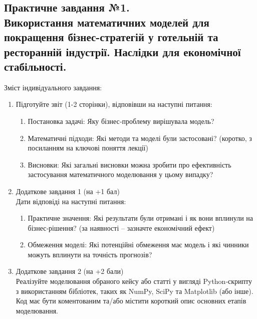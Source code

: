 \documentclass[a4paper,12pt]{article}
\begin{document}
\newpage
    \begin{center}
        \section*{\bfseries{Практичне завдання №1. \\
        Використання математичних моделей для покращення бізнес-стратегій у готельній та ресторанній індустрії. Наслідки для економічної стабільності.
        }}
    \end{center}
    \noindent
    Зміст індивідуального завдання:
    \begin{enumerate}
        \item Підготуйте звіт (1-2 сторінки), відповівши на наступні питання:
        \begin{enumerate}
            \item Постановка задачі: Яку бізнес‑проблему вирішувала модель?
            \item Математичні підходи: Які методи та моделі були застосовані? (коротко, з посиланням на ключові поняття лекції)
            \item Висновки: Які загальні висновки можна зробити про ефективність застосування математичного моделювання у цьому випадку?
        \end{enumerate}
        \item Додаткове завдання 1 (на +1 бал) \\
        Дати відповіді на наступні питання:
        \begin{enumerate}
            \item Практичне значення: Які результати були отримані і як вони вплинули на бізнес‑рішення? (за наявності – зазначте економічний ефект)
            \item Обмеження моделі: Які потенційні обмеження має модель і які чинники можуть вплинути на точність прогнозів?
        \end{enumerate}
        \item Додаткове завдання 2 (на +2 бали) \\
        Реалізуйте моделювання обраного кейсу або статті у вигляді Python‑скрипту з використанням бібліотек, таких як NumPy, SciPy та Matplotlib (або інше). Код має бути коментованим та/або містити короткий опис основних етапів моделювання.
    \end{enumerate}
\end{document}

